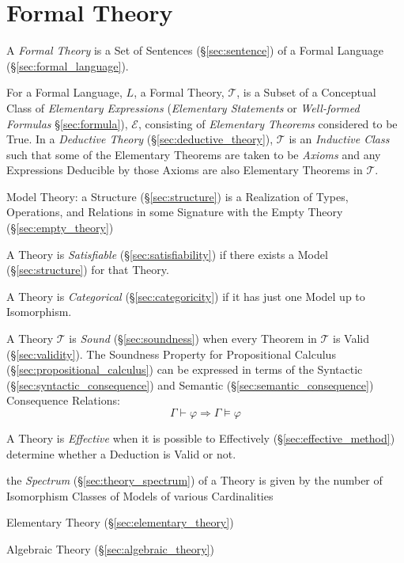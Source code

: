 \section{Formal Theory}\label{sec:formal_theory}

A \emph{Formal Theory} is a Set of Sentences (\S\ref{sec:sentence}) of
a Formal Language (\S\ref{sec:formal_language}).

For a Formal Language, $L$, a Formal Theory, $\mathcal{T}$, is a
Subset of a Conceptual Class of \emph{Elementary Expressions}
(\emph{Elementary Statements} or \emph{Well-formed Formulas}
\S\ref{sec:formula}), $\mathcal{E}$, consisting of \emph{Elementary
  Theorems} considered to be True. In a \emph{Deductive Theory}
(\S\ref{sec:deductive_theory}), $\mathcal{T}$ is an \emph{Inductive
  Class} such that some of the Elementary Theorems are taken to be
\emph{Axioms} and any Expressions Deducible by those Axioms are also
Elementary Theorems in $\mathcal{T}$.

Model Theory: a Structure (\S\ref{sec:structure}) is a Realization of
Types, Operations, and Relations in some Signature with the Empty
Theory (\S\ref{sec:empty_theory})

A Theory is \emph{Satisfiable} (\S\ref{sec:satisfiability}) if there
exists a Model (\S\ref{sec:structure}) for that Theory.

A Theory is \emph{Categorical} (\S\ref{sec:categoricity}) if it has
just one Model up to Isomorphism.

A Theory $\mathcal{T}$ is \emph{Sound} (\S\ref{sec:soundness}) when
every Theorem in $\mathcal{T}$ is Valid (\S\ref{sec:validity}). The
Soundness Property for Propositional Calculus
(\S\ref{sec:propositional_calculus}) can be expressed in terms of the
Syntactic (\S\ref{sec:syntactic_consequence}) and Semantic
(\S\ref{sec:semantic_consequence}) Consequence Relations:
\[
  \Gamma \vdash \varphi \Rightarrow \Gamma \vDash \varphi
\]

A Theory is \emph{Effective} when it is possible to Effectively
(\S\ref{sec:effective_method}) determine whether a Deduction is Valid
or not.

the \emph{Spectrum} (\S\ref{sec:theory_spectrum}) of a Theory is given by the
number of Isomorphism Classes of Models of various Cardinalities

Elementary Theory (\S\ref{sec:elementary_theory})

Algebraic Theory (\S\ref{sec:algebraic_theory})

